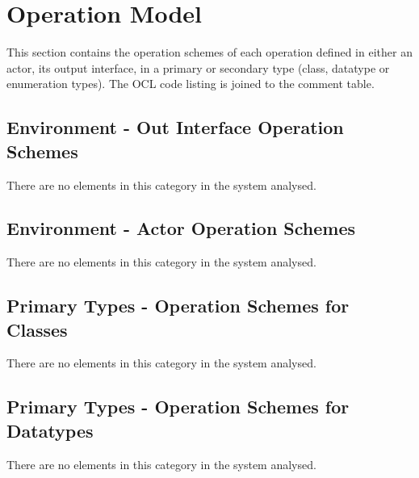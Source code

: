 \chapter{Operation Model}
\label{chap:lu.uni.lassy.excalibur.g01.specification-OM}

This section contains the operation schemes of each operation defined in either an actor, its output interface, in a primary or secondary type (class, datatype or enumeration types). 
The \msrmessir OCL code listing is joined to the comment table.

\lstset{
float,
basicstyle=\scriptsize,
language=Messir,
breakatwhitespace=false,
tabsize=2,
breaklines=true,
numbers=left,
emptylines=1,
numbersep=5pt,
showspaces=false,
showstringspaces=false,
showtabs=false
} 



\section{Environment - Out Interface Operation Schemes}
There are no elements in this category in the system analysed.
		


\section{Environment - Actor Operation Schemes}
There are no elements in this category in the system analysed.
		


\section{Primary Types - Operation Schemes for Classes}
There are no elements in this category in the system analysed.




\section{Primary Types - Operation Schemes for Datatypes}
There are no elements in this category in the system analysed.




